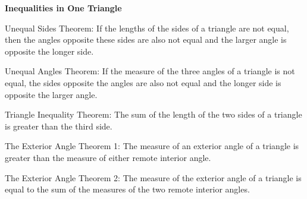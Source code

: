 \begin{center}
\textbf{Inequalities in One Triangle 
}
\end{center}

\vspce
Unequal Sides Theorem: 
 If the lengths of the sides of a triangle are not equal, then the angles opposite these sides are also not equal and the larger angle is opposite the longer side.
 
\vspce 

Unequal Angles Theorem: If the measure of the three angles of a triangle is not equal, the sides opposite the angles are also not equal and the longer side is opposite the larger angle. 

\vspce 

Triangle Inequality Theorem: The sum of the length of the two sides of a triangle is greater than the third side.

\vspce 

The Exterior Angle Theorem 1: The measure of an exterior angle of a triangle is greater than the measure of either remote interior angle.

\vspce 

The Exterior Angle Theorem 2: The measure of the exterior angle of a triangle is equal to the sum of the measures of the two remote interior angles. 